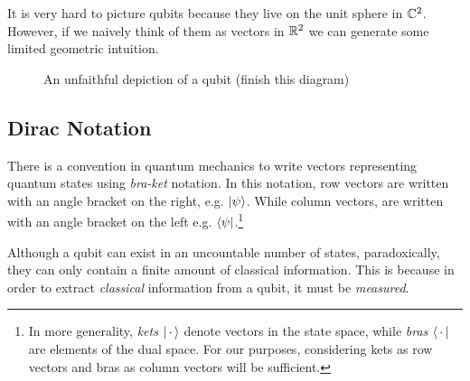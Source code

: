     
        It is very hard to picture qubits because they live on the unit sphere in $\mathbb{C}^2$. However, if we naively 
        think of them as vectors in $\mathbb{R}^2$ we can generate some limited geometric intuition. 
        
        
        
        \begin{figure}[ht]
            \centering
            \begin{center}
            \end{center}
            \caption{An unfaithful depiction of a qubit (finish this diagram)}
        \end{figure}
        
    \subsection{Dirac Notation}

        There is a convention in quantum mechanics to write vectors representing quantum states using 
        \emph{bra-ket} notation. In this notation, row vectors are written with an angle bracket on the right, e.g.
        $\ket{\psi}$. While column vectors, are written with an angle bracket on the left e.g.
        $\bra{\psi}$.\footnote{In more generality, \emph{kets} $\ket{\, \cdot \,}$ denote vectors in the state 
        space, while \emph{bras} $\bra{\, \cdot \,}$ are elements of the dual space. For our purposes, considering 
    kets as row vectors and bras as column vectors will be sufficient.}


       



        
        Although a qubit can exist in an uncountable number of states, paradoxically, they can only contain a 
        finite amount of classical information. This is because in order to extract \emph{classical} information 
        from a qubit, it must be \emph{measured}. 



